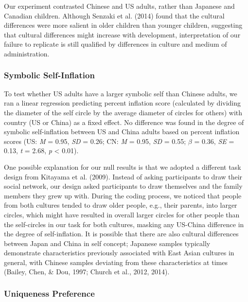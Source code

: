 \documentclass[
  man,floatsintext]{apa6}
\begin{document}
Our experiment contrasted Chinese and US adults, rather than Japanese and Canadian children. Although Senzaki et al. (2014) found that the cultural differences were more salient in older children than younger children, suggesting that cultural differences might increase with development, interpretation of our failure to replicate is still qualified by differences in culture and medium of administration.

\hypertarget{symbolic-self-inflation-1}{%
\subsubsection{Symbolic Self-Inflation}\label{symbolic-self-inflation-1}}

To test whether US adults have a larger symbolic self than Chinese adults, we ran a linear regression predicting percent inflation score (calculated by dividing the diameter of the self circle by the average diameter of circles for others) with country (US or China) as a fixed effect. No difference was found in the degree of symbolic self-inflation between US and China adults based on percent inflation scores (US: \emph{M} = 0.95, \emph{SD} = 0.26; CN: \emph{M} = 0.95, \emph{SD} = 0.55; \(\beta\) = 0.36, \emph{SE} = 0.13, \emph{t} = 2.68, \emph{p} \textless{} 0.01).

One possible explanation for our null results is that we adopted a different task design from Kitayama et al. (2009). Instead of asking participants to draw their social network, our design asked participants to draw themselves and the family members they grew up with. During the coding process, we noticed that people from both cultures tended to draw older people, e.g., their parents, into larger circles, which might have resulted in overall larger circles for other people than the self-circles in our task for both cultures, masking any US-China difference in the degree of self-inflation. It is possible that there are also cultural differences between Japan and China in self concept; Japanese samples typically demonstrate characteristics previously associated with East Asian cultures in general, with Chinese samples deviating from these characteristics at times (Bailey, Chen, \& Dou, 1997; Church et al., 2012, 2014).

\hypertarget{uniqueness-preference-1}{%
\subsubsection{Uniqueness Preference}\label{uniqueness-preference-1}}
\end{document}
